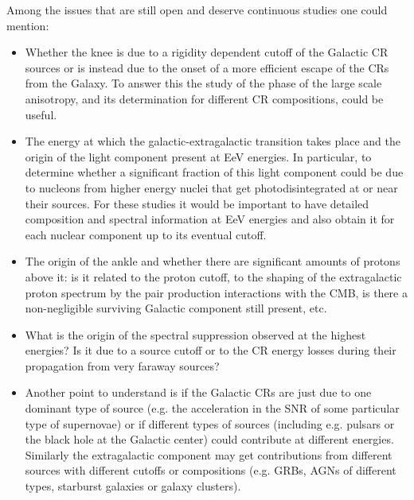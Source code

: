 \documentclass[twoside,12pt]{article}
\begin{document}
Among the issues that are still open and deserve continuous studies one could mention:
\begin{itemize}
\item Whether the knee is due to a rigidity dependent cutoff of the Galactic CR sources or is instead due to the onset of a more efficient escape of the CRs from the Galaxy. To answer this the study of the phase of the large scale anisotropy, and its determination for different CR compositions, could be useful.

\item The energy at which the galactic-extragalactic transition takes place and the origin of the light component present at EeV energies. In particular, to determine whether a significant fraction of this light component could be due to nucleons from  higher energy nuclei that get photodisintegrated at or near their sources. For these studies it would be important to have detailed composition and spectral information at EeV energies and also obtain it for each nuclear component up to its eventual cutoff.

\item The origin of the ankle and whether there are significant amounts of protons above it: is it related to the proton cutoff, to the shaping of the extragalactic proton spectrum by the pair production interactions with the CMB, is there a non-negligible surviving Galactic component still present, etc.

\item What is the origin of the spectral suppression observed at the highest energies? Is it due to a source cutoff or to the CR energy losses during their propagation from very faraway sources?

\item Another point to understand is if the Galactic CRs are just due to one dominant type of source (e.g. the acceleration in the SNR of some particular type of supernovae) or if different types of sources (including e.g. pulsars or the black hole at the Galactic center) could contribute at different energies.
Similarly the extragalactic component may get contributions from different sources with different cutoffs or compositions (e.g. GRBs, AGNs of different types, starburst galaxies or galaxy clusters).


\end{itemize}
\end{document}
